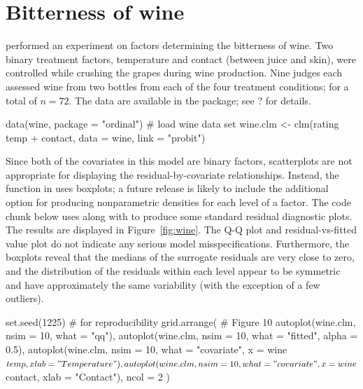 \section{Bitterness of wine}

\citet{randal-analysis-1989} performed an experiment on factors determining the bitterness of wine. Two binary treatment factors, temperature and contact (between juice and skin), were controlled while crushing the grapes during wine production. Nine judges each assessed wine from two bottles from each of the four treatment conditions; for a total of $n = 72$. The data are available in the  package; see ? for details.

\begin{example}
data(wine, package = "ordinal")  # load wine data set
wine.clm <- clm(rating ~ temp + contact, data = wine, link = "probit")
\end{example}

Since both of the covariates in this model are binary factors, scatterplots are not appropriate for displaying the residual-by-covariate relationships. Instead, the  function in  uses boxplots; a future release is likely to include the additional option for producing nonparametric densities for each level of a factor. The code chunk below uses  along with  to produce some standard residual diagnostic plots. The results are displayed in Figure~\ref{fig:wine}. The Q-Q plot and residual-vs-fitted value plot do not indicate any serious model misspecifications. Furthermore, the boxplots reveal that the medians of the surrogate residuals are very close to zero, and the distribution of the residuals within each level appear to be symmetric and have approximately the same variability (with the exception of a few outliers).

\begin{example}
set.seed(1225)  # for reproducibility
grid.arrange(  # Figure 10
  autoplot(wine.clm, nsim = 10, what = "qq"),
  autoplot(wine.clm, nsim = 10, what = "fitted", alpha = 0.5),
  autoplot(wine.clm, nsim = 10, what = "covariate", x = wine$temp, 
           xlab = "Temperature"),
  autoplot(wine.clm, nsim = 10, what = "covariate", x = wine$contact,
           xlab = "Contact"),
  ncol = 2
)
\end{example}

